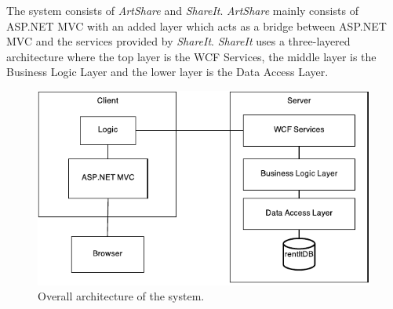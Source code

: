 \documentclass[../report.tex]{subfiles}
\begin{document}
\graphicspath{{img/}{../img/}}

The system consists of \textit{ArtShare} and \textit{ShareIt}. \textit{ArtShare} mainly consists of ASP.NET MVC with an added layer which acts as a bridge between ASP.NET MVC and the services provided by \textit{ShareIt}. \textit{ShareIt} uses a three-layered architecture where the top layer is the WCF Services, the middle layer is the Business Logic Layer and the lower layer is the Data Access Layer. 
\begin{figure}[H]
\centering
\includegraphics{overall_architecture.pdf}
\caption{Overall architecture of the system.}
\end{figure}
\end{document}
